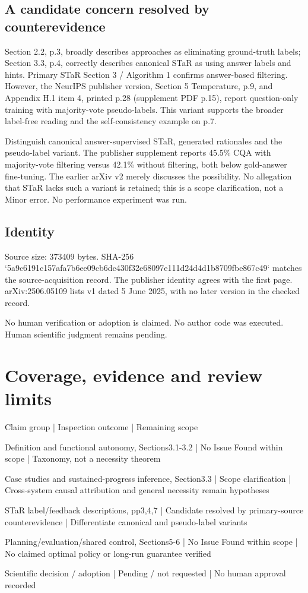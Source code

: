 \documentclass[10pt]{article}
\begin{document}
\subsection*{A candidate concern resolved by counterevidence}
Section 2.2, p.3, broadly describes approaches as eliminating ground-truth labels; Section 3.3, p.4, correctly describes canonical STaR as using answer labels and hints. Primary STaR Section 3 / Algorithm 1 confirms answer-based filtering. However, the NeurIPS publisher version, Section 5 Temperature, p.9, and Appendix H.1 item 4, printed p.28 (supplement PDF p.15), report question-only training with majority-vote pseudo-labels. This variant supports the broader label-free reading and the self-consistency example on p.7.\par
Distinguish canonical answer-supervised STaR, generated rationales and the pseudo-label variant. The publisher supplement reports 45.5\% CQA with majority-vote filtering versus 42.1\% without filtering, both below gold-answer fine-tuning. The earlier arXiv v2 merely discusses the possibility. No allegation that STaR lacks such a variant is retained; this is a scope clarification, not a Minor error. No performance experiment was run.\par
\subsection*{Identity}
Source size: 373409 bytes. SHA-256 `5a9c6191c157afa7b6ee09cb6dc430f32e68097e111d24d4d1b8709fbe867c49` matches the source-acquisition record. The publisher identity agrees with the first page. arXiv:2506.05109 lists v1 dated 5 June 2025, with no later version in the checked record.\par
No human verification or adoption is claimed. No author code was executed. Human scientific judgment remains pending.\par
\section*{Coverage, evidence and review limits}
Claim group | Inspection outcome | Remaining scope\par
Definition and functional autonomy, Sections3.1-3.2 | No Issue Found within scope | Taxonomy, not a necessity theorem\par
Case studies and sustained-progress inference, Section3.3 | Scope clarification | Cross-system causal attribution and general necessity remain hypotheses\par
STaR label/feedback descriptions, pp3,4,7 | Candidate resolved by primary-source counterevidence | Differentiate canonical and pseudo-label variants\par
Planning/evaluation/shared control, Sections5-6 | No Issue Found within scope | No claimed optimal policy or long-run guarantee verified\par
Scientific decision / adoption | Pending / not requested | No human approval recorded\par
\end{document}
